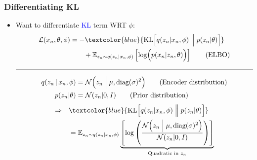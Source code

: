 \documentclass[xcolor=table,dvipsnames]{beamer}
\begin{document}
\begin{frame}[t]
    \frametitle{Differentiating KL}
    \begin{itemize}
        \item Want to differentiate \textcolor{blue}{KL} term WRT $\phi$:
        \begin{align*}
            \mathcal{L}(x_n, \theta, \phi) &= -\textcolor{blue}{\text{KL}\Bigl[q(z_n \vert x_n, \phi) \Bigm\Vert p(z_n \vert \theta)\Bigr]} \\
            &\qquad + \mathbb{E}_{z_n\sim q(z_n \vert x_n, \phi)}\left[ \log \Bigl(p(x_n \vert z_n, \theta)\Bigr) \right] \tag{ELBO}
        \end{align*}
        \hrule
        \begin{align*}
            q(z_n \,\vert\, x_n, \phi) &= \mathcal{N}\Bigl( z_n \Bigm\vert \mu, \text{diag}(\sigma)^2 \Bigr) \tag{Encoder distribution} \\
            p(z_n\vert\theta) &= \mathcal{N}(z_n\vert 0, I) \tag{Prior distribution} \\
        \end{align*}
        \begin{align*}
            \Rightarrow\quad &\textcolor{blue}{\text{KL}\Bigl[q(z_n \vert x_n, \phi) \Bigm\Vert p(z_n \vert \theta)\Bigr]} \\
            &= \mathbb{E}_{z_n\sim q(z_n \vert x_n, \phi)}\underbrace{\left[ \log \left(\frac{\mathcal{N}\Bigl( z_n \Bigm\vert \mu, \text{diag}(\sigma)^2 \Bigr)}{\mathcal{N}(z_n\vert 0, I)}\right) \right]}_\text{Quadratic in $z_n$} \\
        \end{align*}
    \end{itemize}
\end{frame}
\end{document}
